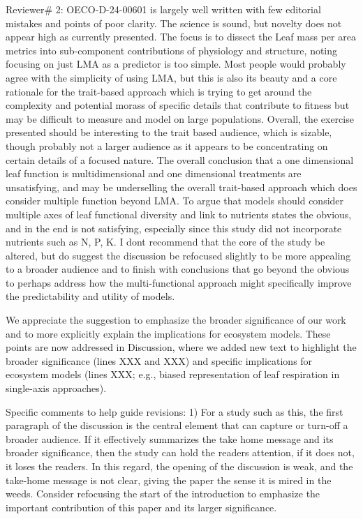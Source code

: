 \documentclass[
  12pt,
  letterpaper,
  DIV=11,
  numbers=noendperiod]{scrartcl}
\renewenvironment{quote}
  {\begin{customblockquote}\color{blockquote-text}\ignorespaces}
  {\end{customblockquote}}
\begin{document}
\begin{quote}
Reviewer\# 2: OECO-D-24-00601 is largely well written with few editorial
mistakes and points of poor clarity. The science is sound, but novelty
does not appear high as currently presented. The focus is to dissect the
Leaf mass per area metrics into sub-component contributions of
physiology and structure, noting focusing on just LMA as a predictor is
too simple. Most people would probably agree with the simplicity of
using LMA, but this is also its beauty and a core rationale for the
trait-based approach which is trying to get around the complexity and
potential morass of specific details that contribute to fitness but may
be difficult to measure and model on large populations. Overall, the
exercise presented should be interesting to the trait based audience,
which is sizable, though probably not a larger audience as it appears to
be concentrating on certain details of a focused nature. The overall
conclusion that a one dimensional leaf function is multidimensional and
one dimensional treatments are unsatisfying, and may be underselling the
overall trait-based approach which does consider multiple function
beyond LMA. To argue that models should consider multiple axes of leaf
functional diversity and link to nutrients states the obvious, and in
the end is not satisfying, especially since this study did not
incorporate nutrients such as N, P, K. I dont recommend that the core of
the study be altered, but do suggest the discussion be refocused
slightly to be more appealing to a broader audience and to finish with
conclusions that go beyond the obvious to perhaps address how the
multi-functional approach might specifically improve the predictability
and utility of models.
\end{quote}

We appreciate the suggestion to emphasize the broader significance of
our work and to more explicitly explain the implications for ecosystem
models. These points are now addressed in Discussion, where we added new
text to highlight the broader significance (lines XXX and XXX) and
specific implications for ecosystem models (lines XXX; e.g., biased
representation of leaf respiration in single-axis approaches).

\begin{quote}
Specific comments to help guide revisions: 1) For a study such as this,
the first paragraph of the discussion is the central element that can
capture or turn-off a broader audience. If it effectively summarizes the
take home message and its broader significance, then the study can hold
the readers attention, if it does not, it loses the readers. In this
regard, the opening of the discussion is weak, and the take-home message
is not clear, giving the paper the sense it is mired in the weeds.
Consider refocusing the start of the introduction to emphasize the
important contribution of this paper and its larger significance.
\end{quote}
\end{document}
